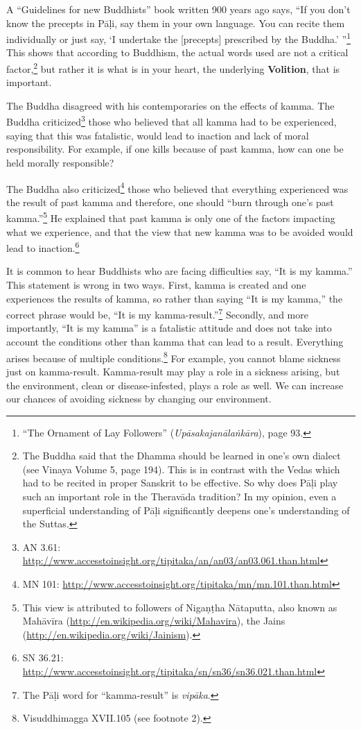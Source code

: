 A “Guidelines for new Buddhists” book written 900 years ago says, “If you don’t know the precepts in Pāḷi, say them in your own language. You can recite them individually or just say, ‘I undertake the [precepts] prescribed by the Buddha.’ ”\footnote{“The Ornament of Lay Followers” (\textit{Upāsakajanālaṅkāra}), page 93.} This shows that according to Buddhism, the actual words used are not a critical factor,\footnote{The Buddha said that the Dhamma should be learned in one’s own dialect (see Vinaya Volume 5, page 194). This is in contrast with the Vedas which had to be recited in proper Sanskrit to be effective. So why does Pāḷi play such an important role in the Theravāda tradition? In my opinion, even a superficial understanding of Pāḷi significantly deepens one’s understanding of the Suttas.} but rather it is what is in your heart, the underlying \textbf{Volition}, that is important.

The Buddha disagreed with his contemporaries on the effects of kamma. The Buddha criticized\footnote{AN 3.61: \url{http://www.accesstoinsight.org/tipitaka/an/an03/an03.061.than.html}} those who believed that all kamma had to be experienced, saying that this was fatalistic, would lead to inaction and lack of moral responsibility. For example, if one kills because of past kamma, how can one be held morally responsible? 

The Buddha also criticized\footnote{MN 101: \url{http://www.accesstoinsight.org/tipitaka/mn/mn.101.than.html}} those who believed that everything experienced was the result of past kamma and therefore, one should “burn through one’s past kamma.”\footnote{This view is attributed to followers of Nigaṇṭha Nātaputta, also known as Mahāvīra (\url{http://en.wikipedia.org/wiki/Mahavira}), the Jains (\url{http://en.wikipedia.org/wiki/Jainism}).} He explained that past kamma is only one of the factors impacting what we experience, and that the view that new kamma was to be avoided would lead to inaction.\footnote{SN 36.21: \url{http://www.accesstoinsight.org/tipitaka/sn/sn36/sn36.021.than.html}}

It is common to hear Buddhists who are facing difficulties say, “It is my kamma.” This statement is wrong in two ways. First, kamma is created and one experiences the results of kamma, so rather than saying “It is my kamma,” the correct phrase would be, “It is my kamma-result.”\footnote{The Pāḷi word for “kamma-result” is \textit{vipāka}.} Secondly, and more importantly, “It is my kamma” is a fatalistic attitude and does not take into account the conditions other than kamma that can lead to a result. Everything arises because of multiple conditions.\footnote{Visuddhimagga XVII.105 (see footnote 2).} For example, you cannot blame sickness just on kamma-result. Kamma-result may play a role in a sickness arising, but the environment, clean or disease-infested, plays a role as well. We can increase our chances of avoiding sickness by changing our environment.

